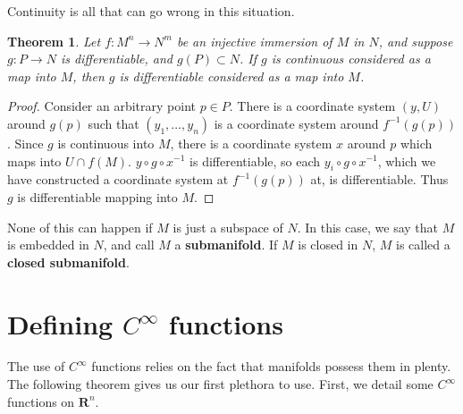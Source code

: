 \documentclass[12pt]{report}
\theoremstyle{plain}
\newtheorem{theorem}{Theorem}[chapter]
\theoremstyle{definition}
\begin{document}
Continuity is all that can go wrong in this situation.

\begin{theorem}
    Let $f:M^n \to N^m$ be an injective immersion of $M$ in $N$, and suppose $g: P \to N$ is differentiable, and $g(P) \subset N$. If $g$ is continuous considered as a map into $M$, then $g$ is differentiable considered as a map into $M$.
\end{theorem}
\begin{proof}
    Consider an arbitrary point $p \in P$. There is a coordinate system $(y,U)$ around $g(p)$ such that $(y_1, \dots, y_n)$ is a coordinate system around $f^{-1}(g(p))$. Since $g$ is continuous into $M$, there is a coordinate system $x$ around $p$ which maps into $U \cap f(M)$. $y \circ g \circ x^{-1}$ is differentiable, so each $y_i \circ g \circ x^{-1}$, which we have constructed a coordinate system at $f^{-1}(g(p))$ at, is differentiable. Thus $g$ is differentiable mapping into $M$.
\end{proof}

None of this can happen if $M$ is just a subspace of $N$. In this case, we say that $M$ is embedded in $N$, and call $M$ a {\bf submanifold}. If $M$ is closed in $N$, $M$ is called a {\bf closed submanifold}.




\section{Defining $C^\infty$ functions}

The use of $C^\infty$ functions relies on the fact that manifolds possess them in plenty. The following theorem gives us our first plethora to use. First, we detail some $C^\infty$ functions on $\mathbf{R}^n$.
\end{document}
